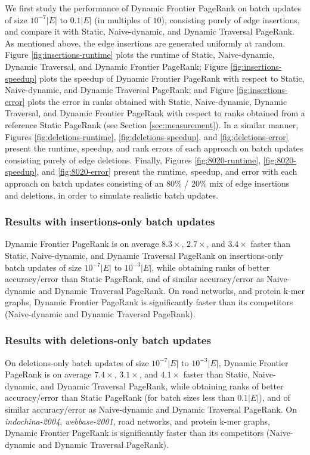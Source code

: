 We first study the performance of Dynamic Frontier PageRank on batch updates of size $10^{-7}|E|$ to $0.1|E|$ (in multiples of $10$), consisting purely of edge insertions, and compare it with Static, Naive-dynamic, and Dynamic Traversal PageRank. As mentioned above, the edge insertions are generated uniformly at random. Figure \ref{fig:insertions-runtime} plots the runtime of Static, Naive-dynamic, Dynamic Traversal, and Dynamic Frontier PageRank; Figure \ref{fig:insertions-speedup} plots the speedup of Dynamic Frontier PageRank with respect to Static, Naive-dynamic, and Dynamic Traversal PageRank; and Figure \ref{fig:insertions-error} plots the error in ranks obtained with Static, Naive-dynamic, Dynamic Traversal, and Dynamic Frontier PageRank with respect to ranks obtained from a reference Static PageRank (see Section \ref{sec:measurement}). In a similar manner, Figures \ref{fig:deletions-runtime}, \ref{fig:deletions-speedup}, and \ref{fig:deletions-error} present the runtime, speedup, and rank errors of each approach on batch updates consisting purely of edge deletions. Finally, Figures \ref{fig:8020-runtime}, \ref{fig:8020-speedup}, and \ref{fig:8020-error} present the runtime, speedup, and error with each approach on batch updates consisting of an $80\%$ / $20\%$ mix of edge insertions and deletions, in order to simulate realistic batch updates.


\subsubsection{Results with insertions-only batch updates}

Dynamic Frontier PageRank is on average $8.3\times$, $2.7\times$, and $3.4\times$ faster than Static, Naive-dynamic, and Dynamic Traversal PageRank on insertions-only batch updates of size $10^{-7}|E|$ to $10^{-3}|E|$, while obtaining ranks of better accuracy/error than Static PageRank, and of similar accuracy/error as Naive-dynamic and Dynamic Traversal PageRank. On road networks, and protein k-mer graphs, Dynamic Frontier PageRank is significantly faster than its competitors (Naive-dynamic and Dynamic Traversal PageRank).


\subsubsection{Results with deletions-only batch updates}

On deletions-only batch updates of size $10^{-7}|E|$ to $10^{-3}|E|$, Dynamic Frontier PageRank is on average $7.4\times$, $3.1\times$, and $4.1\times$ faster than Static, Naive-dynamic, and Dynamic Traversal PageRank, while obtaining ranks of better accuracy/error than Static PageRank (for batch sizes less than $0.1|E|$), and of similar accuracy/error as Naive-dynamic and Dynamic Traversal PageRank. On \textit{indochina-2004}, \textit{webbase-2001}, road networks, and protein k-mer graphs, Dynamic Frontier PageRank is significantly faster than its competitors (Naive-dynamic and Dynamic Traversal PageRank).


